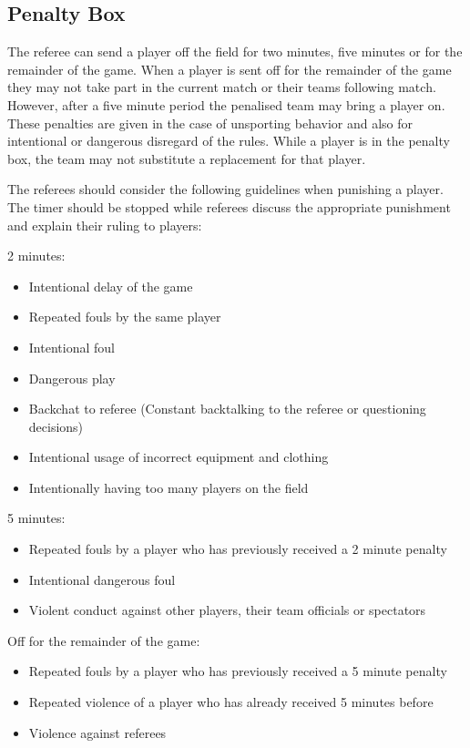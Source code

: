 \subsection{Penalty Box}
The referee can send a player off the field for two minutes, five minutes or for the remainder of the game.
When a player is sent off for the remainder of the game they may not take part in the current match or their teams following match.
However, after a five minute period the penalised team may bring a player on.
These penalties are given in the case of unsporting behavior and also for intentional or dangerous disregard of the rules.
While a player is in the penalty box, the team may not substitute a replacement for that player.

The referees should consider the following guidelines when punishing a player.
The timer should be stopped while referees discuss the appropriate punishment and explain their ruling to players:

2 minutes:
\begin{itemize}
\item Intentional delay of the game
\item Repeated fouls by the same player
\item Intentional foul
\item Dangerous play
\item Backchat to referee (Constant backtalking to the referee or questioning decisions)
\item Intentional usage of incorrect equipment and clothing
\item Intentionally having too many players on the field
\end{itemize}
5 minutes:
\begin{itemize}
\item Repeated fouls by a player who has previously received a 2 minute penalty
\item Intentional dangerous foul
\item Violent conduct against other players, their team officials or spectators
\end{itemize}
Off for the remainder of the game:
\begin{itemize}
\item Repeated fouls by a player who has previously received a 5 minute penalty
\item Repeated violence of a player who has already received 5 minutes before
\item Violence against referees
\end{itemize}

